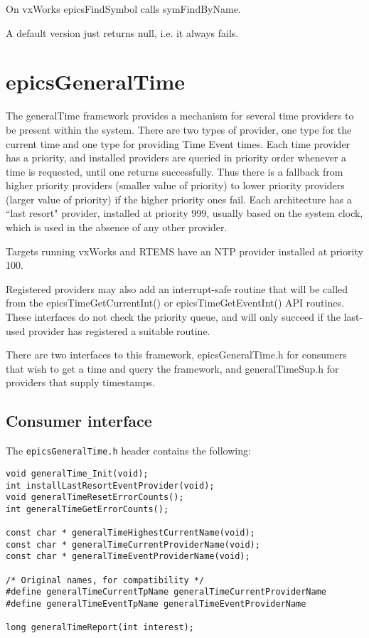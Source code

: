 On vxWorks epicsFindSymbol calls symFindByName.

A default version just returns null, i.e. it always fails.

\section{epicsGeneralTime}

The generalTime framework provides a mechanism for several time providers to be present within the system.  There are 
two types of provider, one type for the current time and one type for providing Time Event times.  Each time provider has 
a priority, and installed providers are queried in priority order whenever a time is requested, until one returns successfully.  
Thus there is a fallback from higher priority providers (smaller value of priority) to lower priority providers (larger value 
of priority) if the higher priority ones fail.  Each architecture has a ``last resort" provider, installed at priority 999, usually 
based on the system clock, which is used in the absence of any other provider.

Targets running vxWorks and RTEMS have an NTP provider installed at priority 100.

Registered providers may also add an interrupt-safe routine that will be called from the epicsTimeGetCurrentInt() or 
epicsTimeGetEventInt()  API routines. These interfaces do not check the priority queue, and will only succeed if the last-
used provider has registered a suitable routine.

There are two interfaces to this framework, epicsGeneralTime.h for consumers that wish to get a time and query the 
framework, and generalTimeSup.h for providers that supply timestamps.

\subsection{Consumer interface}

The \verb|epicsGeneralTime.h| header contains the following:

\begin{verbatim}
void generalTime_Init(void);
int installLastResortEventProvider(void);
void generalTimeResetErrorCounts();
int generalTimeGetErrorCounts();

const char * generalTimeHighestCurrentName(void);
const char * generalTimeCurrentProviderName(void);
const char * generalTimeEventProviderName(void);

/* Original names, for compatibility */
#define generalTimeCurrentTpName generalTimeCurrentProviderName
#define generalTimeEventTpName generalTimeEventProviderName

long generalTimeReport(int interest);
\end{verbatim}

